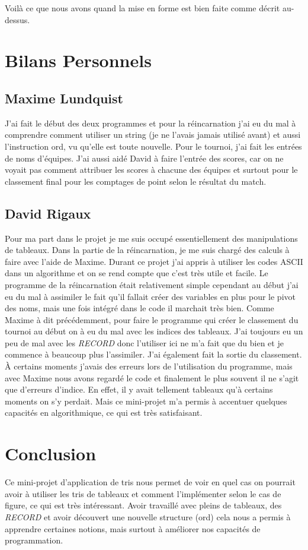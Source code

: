 \documentclass[13pt]{article}
\begin{document}
Voilà ce que nous avons quand la mise en forme est bien faite comme décrit au-dessus.
\section{Bilans Personnels}
\subsection{Maxime Lundquist}

J'ai fait le début des deux programmes et pour la réincarnation j'ai eu du mal à comprendre comment utiliser un string (je ne l'avais jamais utilisé avant) et aussi l'instruction ord, vu qu'elle est toute nouvelle.
Pour le tournoi, j'ai fait les entrées de noms d'équipes. J'ai aussi aidé David à faire l'entrée des scores, car on ne voyait pas comment attribuer les scores à chacune des équipes et surtout pour le classement final pour les comptages de point selon le résultat du match. 
\subsection{David Rigaux}
Pour ma part dans le projet je me suis occupé essentiellement des manipulations de tableaux. Dans la partie de la réincarnation, je me suis chargé des calculs à faire avec l'aide de Maxime. Durant ce projet j'ai appris à utiliser les codes ASCII dans un algorithme et on se rend compte que c'est très utile et facile. Le programme de la réincarnation était relativement simple cependant au début j'ai eu du mal à assimiler le fait qu'il fallait créer des variables en plus pour le pivot des noms, mais une fois intégré dans le code il marchait très bien. Comme Maxime à dit précédemment, pour faire le programme qui créer le classement du tournoi au début on à eu du mal avec les indices des tableaux. J'ai toujours eu un peu de mal avec les \emph{RECORD} donc l'utiliser ici ne m'a fait que du bien et je commence à beaucoup plus l'assimiler. J'ai également fait la sortie du classement. À certains moments j'avais des erreurs lors de l'utilisation du programme, mais avec Maxime nous avons regardé le code et finalement le plus souvent il ne s'agit que d'erreurs d'indice. En effet, il y avait tellement tableaux qu'à certains moments on s'y perdait. Mais ce mini-projet m'a permis à accentuer quelques capacités en algorithmique, ce qui est très satisfaisant.
\section{Conclusion}
Ce mini-projet d'application de tris nous permet de voir en quel cas on pourrait avoir à utiliser les tris de tableaux et comment l'implémenter selon le cas de figure, ce qui est très intéressant. Avoir travaillé avec pleins de tableaux, des \emph{RECORD} et avoir découvert une nouvelle structure (ord) cela nous a permis à apprendre certaines notions, mais surtout à améliorer nos capacités de programmation.
\end{document}
